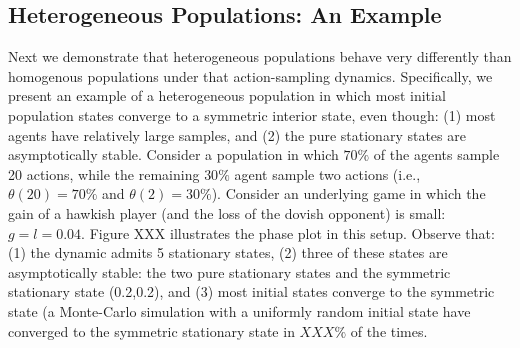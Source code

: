 \documentclass[12pt]{article}
\numberwithin{equation}{section}
\numberwithin{figure}{section}
\theoremstyle{definition}
\theoremstyle{plain}
\theoremstyle{plain}
\theoremstyle{plain}
\theoremstyle{remark}
\theoremstyle{plain}
\theoremstyle{plain}
\begin{document}
\subsection{Heterogeneous Populations: An Example}\label{subsec-hetro-action}
Next we demonstrate that heterogeneous populations behave very differently than homogenous populations under that action-sampling dynamics. Specifically, we present an example of a heterogeneous population in which most initial population states converge to a symmetric interior state, even though: (1) most agents have relatively large samples, and (2) the pure stationary states are asymptotically stable.
Consider a population in which $70\%$ of the agents sample 20 actions, while the remaining $30\%$ agent sample two actions (i.e., $\theta(20)=70\%$ and $\theta(2)=30\%$). Consider an underlying game in which the gain of a hawkish player (and the loss of the dovish opponent) is small: $g=l=0.04.$ Figure XXX illustrates the phase plot in this setup. Observe that: (1) the dynamic admits 5 stationary states, (2) three of these states are asymptotically stable: the two pure stationary states and the symmetric stationary state (0.2,0.2),
and (3) most initial states converge to the symmetric state (a Monte-Carlo simulation with a uniformly random initial state have converged to the symmetric stationary state in $XXX\%$ of the times.


\end{document}
